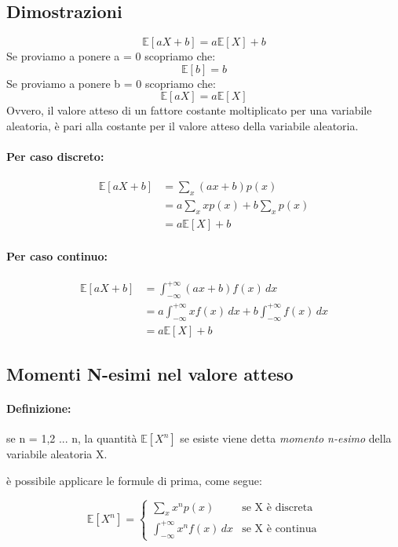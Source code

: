 \documentclass[]{article}
\newcommand{\ev}{\mathbb{E}[X]}
\renewcommand{\ev}[1]{\mathbb{E}[#1]}
\newcommand{\definizione}{\paragraph{Definizione:}}
\begin{document}
    \subsection{Dimostrazioni}
    \[ \ev{aX+b} = a \ev{X} + b \]
    Se proviamo a ponere a = 0 scopriamo che:
    \[ \ev{b} = b \]
    Se proviamo a ponere b = 0 scopriamo che:
    \[ \ev{aX} = a \ev{X} \]
    Ovvero, il valore atteso di un fattore costante moltiplicato per una variabile aleatoria,
    è pari alla costante per il valore atteso della variabile aleatoria.

    \paragraph{Per caso discreto:}
    \begin{equation*}
        \begin{split}
            \ev{aX + b} & = \sum_{x}^{} (ax + b) p(x) \\
            & = a \sum_{x}^{} xp(x) + b \sum_{x}^{} p(x) \\
            & = a\ev{X} + b
        \end{split}
    \end{equation*}

    \paragraph{Per caso continuo:}
    \begin{equation*}
        \begin{split}
            \ev{aX + b} & = \int_{-\infty}^{+\infty} (ax + b) f(x) \, dx \\
            & = a \int_{-\infty}^{+\infty} xf(x) \,dx + b \int_{-\infty}^{+\infty} f(x) \, dx \\
            & = a\ev{X} + b
        \end{split}
    \end{equation*}

    \subsection{Momenti N-esimi nel valore atteso}
    \definizione se n = 1,2 ... n, la quantità $\ev{X^n}$ se esiste viene detta \textit{momento n-esimo} della variabile aleatoria X. \\
    \linebreak[4]
    \centerline{è possibile applicare le formule di prima, come segue:}
    \begin{equation*}
        \ev{X^n} =
        \begin{cases}
            \sum_{x}^{} x^n p(x) & \text{se X è discreta} \\
            \int_{-\infty}^{+\infty} x^n f(x) \, dx & \text{se X è continua}
        \end{cases}
    \end{equation*}
\end{document}
